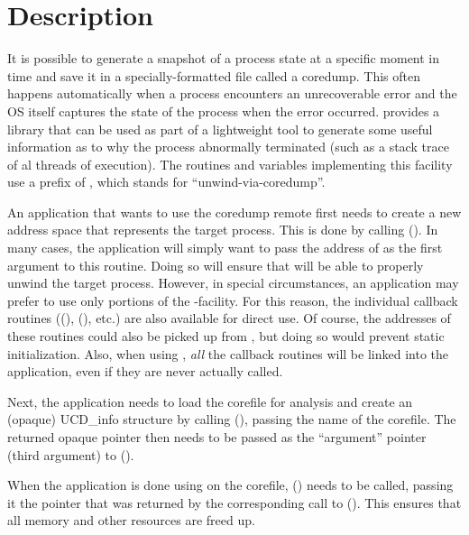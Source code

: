 \documentclass{article}
\begin{document}
\section{Description}

It is possible to generate a snapshot of a process state at a specific moment in
time and save it in a specially-formatted file called a coredump.
This often happens automatically when a process encounters an unrecoverable
error and the OS itself captures the state of the process when the error
occurred.
 provides a library that can be used as part of a lightweight
tool to generate some useful information as to why the process abnormally
terminated (such as a stack trace of al threads of execution).
The routines and variables
implementing this facility use a prefix of , which
stands for ``unwind-via-coredump''.

An application that wants to use the coredump remote first needs
to create a new  address space that represents the
target process.  This is done by calling
().  In many cases, the application
will simply want to pass the address of  as the
first argument to this routine.  Doing so will ensure that
 will be able to properly unwind the target process.
However, in special circumstances, an application may prefer to use
only portions of the -facility.  For this reason, the
individual callback routines ((),
(), etc.)  are also available for direct
use.  Of course, the addresses of these routines could also be picked
up from , but doing so would prevent static
initialization.  Also, when using , \emph{all}
the callback routines will be linked into the application, even if
they are never actually called.

Next, the application needs to load the corefile for analysis and create an
(opaque) UCD\_info structure by calling (),
passing the name of the corefile.
The returned opaque pointer then needs to be
passed as the ``argument'' pointer (third argument) to
().

When the application is done using  on the corefile,
() needs to be called,
passing it the pointer that was returned by the corresponding call to
().
This ensures that all memory and other resources are freed up.
\end{document}
